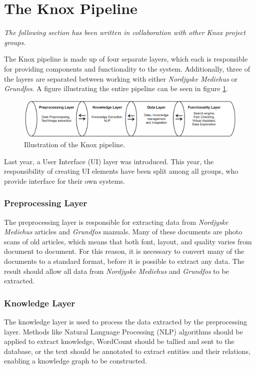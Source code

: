 \section{The Knox Pipeline}\label{the_knox_pipeline}
\textit{The following section has been written in collaboration with other Knox project groups.}


The Knox pipeline is made up of four separate layers, which each is responsible for providing components and functionality to the system.
 Additionally, three of the layers are separated between working with either \textit{Nordjyske Mediehus} or \textit{Grundfos}.
  A figure illustrating the entire pipeline can be seen in figure \ref{fig:pipeline}.

\begin{figure}[h]
    \centering
    \includegraphics[width=1\textwidth]{Images/Pipeline.PNG}
    \caption{Illustration of the Knox pipeline\label{fig:pipeline}.}
\end{figure}

Last year, a User Interface (UI) layer was introduced. This year, the responsibility of creating UI elements have been split among all groups, who provide interface for their own systems.

\subsubsection{Preprocessing Layer}
The preprocessing layer is responsible for extracting data from \textit{Nordjyske Mediehus} articles and \textit{Grundfos} manuals. Many of these documents are photo scans of old articles, which means that both font, layout, and quality varies from document to document. For this reason, it is necessary to convert many of the documents to a standard format, before it is possible to extract any data. The result should allow all data from \textit{Nordjyske Mediehus} and \textit{Grundfos} to be extracted. 

\subsubsection{Knowledge Layer}
The knowledge layer is used to process the data extracted by the preprocessing layer. Methods like Natural Language Processing (NLP) algorithms should be applied to extract knowledge, WordCount should be tallied and sent to the database, or the text should be annotated to extract entities and their relations, enabling a knowledge graph to be constructed.

